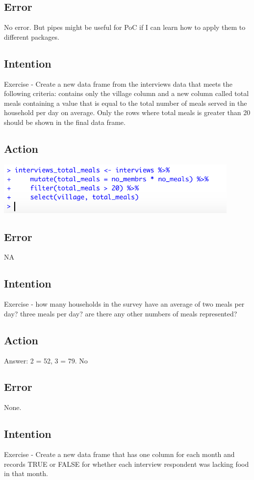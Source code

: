\documentclass{article}
\begin{document}
\subsection{Error}
No error. But pipes might be useful for PoC if I can learn how to apply them to different packages.

\subsection{Intention}
Exercise - Create a new data frame from the interviews data that meets the following criteria: contains only the village column and a new column called total meals containing a value that is equal to the total number of meals served in the household per day on average. Only the rows where total meals is greater than 20 should be shown in the final data frame.

\subsection{Action}
\includegraphics[width=12cm]{mutate.png}

\subsection{Error}
NA

\subsection{Intention}
Exercise - how many households in the survey have an average of two meals per day? three meals per day? are there any other numbers of meals represented? 

\subsection{Action}
Answer: 2 = 52, 3 = 79. No 

\subsection{Error}
None. 

\subsection{Intention}
Exercise - Create a new data frame that has one column for each month and records TRUE or FALSE for whether each interview respondent was lacking food in that month.
\end{document}
